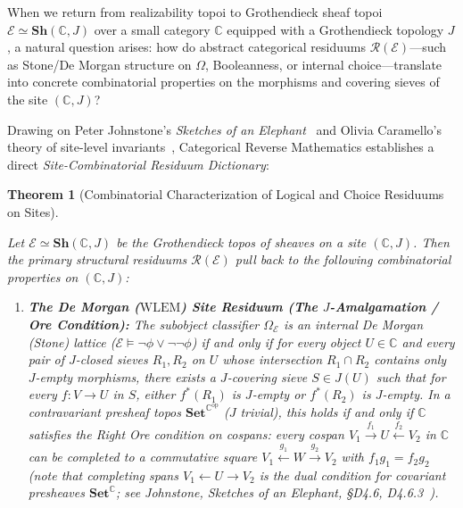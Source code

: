 \documentclass[10pt,twoside,openright]{book}
\theoremstyle{crmplain}
\newtheorem{theorem}{Theorem}[section]
\theoremstyle{crmdef}
\theoremstyle{crmremark}
\begin{document}
When we return from realizability topoi to Grothendieck sheaf topoi $\mathcal{E} \simeq \mathbf{Sh}(\mathbb{C}, J)$ over a small category $\mathbb{C}$ equipped with a Grothendieck topology $J$, a natural question arises: how do abstract categorical residuums $\mathcal{R}(\mathcal{E})$---such as Stone/De Morgan structure on $\Omega$, Booleanness, or internal choice---translate into concrete combinatorial properties on the morphisms and covering sieves of the site $(\mathbb{C}, J)$?

Drawing on Peter Johnstone's \emph{Sketches of an Elephant}~\cite{Johnstone02} and Olivia Caramello's theory of site-level invariants~\cite{Caramello18}, Categorical Reverse Mathematics establishes a direct \emph{Site-Combinatorial Residuum Dictionary}:

\begin{theorem}[Combinatorial Characterization of Logical and Choice Residuums on Sites]\label{thm:site-dictionary}%
%

Let $\mathcal{E} \simeq \mathbf{Sh}(\mathbb{C}, J)$ be the Grothendieck topos of sheaves on a site $(\mathbb{C}, J)$. Then the primary structural residuums $\mathcal{R}(\mathcal{E})$ pull back to the following combinatorial properties on $(\mathbb{C}, J)$:

\begin{enumerate}[label=(\arabic*),leftmargin=2em]

  \item \textbf{The De Morgan ($\mathrm{WLEM}$) Site Residuum (The $J$-Amalgamation / Ore Condition):} The subobject classifier $\Omega_{\mathcal{E}}$ is an internal De Morgan (Stone) lattice ($\mathcal{E} \models \neg\phi \vee \neg\neg\phi$) if and only if for every object $U \in \mathbb{C}$ and every pair of $J$-closed sieves $R_1, R_2$ on $U$ whose intersection $R_1 \cap R_2$ contains only $J$-empty morphisms, there exists a $J$-covering sieve $S \in J(U)$ such that for every $f: V \to U$ in $S$, either $f^*(R_1)$ is $J$-empty or $f^*(R_2)$ is $J$-empty. In a contravariant presheaf topos $\mathbf{Set}^{\mathbb{C}^{\mathrm{op}}}$ ($J$ trivial), this holds if and only if $\mathbb{C}$ satisfies the \emph{Right Ore condition on cospans}: every cospan $V_1 \xrightarrow{f_1} U \xleftarrow{f_2} V_2$ in $\mathbb{C}$ can be completed to a commutative square $V_1 \xleftarrow{g_1} W \xrightarrow{g_2} V_2$ with $f_1 g_1 = f_2 g_2$ (note that completing spans $V_1 \leftarrow U \rightarrow V_2$ is the dual condition for covariant presheaves $\mathbf{Set}^{\mathbb{C}}$; see Johnstone, \emph{Sketches of an Elephant}, \S D4.6, D4.6.3~\cite{Johnstone02}).


\end{enumerate}
\end{theorem}
\end{document}
